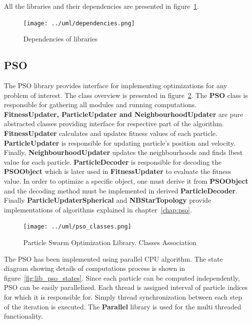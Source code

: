 \documentclass{mini}
\begin{document}
All the libraries and their dependencies are presented in figure~\ref{fig:lib_dependencies}.

\begin{figure}[H]
    \centering
    \texttt{[image: ../uml/dependencies.png]}
    \caption{Dependencies of libraries}
    \label{fig:lib_dependencies}
\end{figure}

\newpage

\subsection{PSO}

The PSO library provides interface for implementing optimizations for any problem of interest. The class overview is presented in figure~\ref{fig:lib_pso_classes}. The {\bf PSO} class is responsible for gathering all modules and running computations. {\bf FitnessUpdater, ParticleUpdater and NeighbourhoodUpdater} are pure abstracted classes providing interface for respective part of the algorithm. {\bf FitnessUpdater} calculates and updates fitness values of each particle. {\bf ParticleUpdater} is responsible for updating particle's position and velocity. Finally, {\bf NeighbourhoodUpdater} updates the neighbourhoods and finds lbest value for each particle. {\bf ParticleDecoder} is responsible for decoding the {\bf PSOObject} which is later used in {\bf FitnessUpdater} to evaluate the fitness value. In order to optimize a specific object, one must derive it from {\bf PSOObject} and the decoding method must be implemented in derived {\bf ParticleDecoder}. Finally {\bf ParticleUpdaterSpherical} and {\bf NBStarTopology} provide implementations of algorithms explained in chapter~\ref{chap:pso}.

\begin{figure}
    \centering
    \texttt{[image: ../uml/pso\_classes.png]}
    \caption{Particle Swarm Optimization Library. Classes Association}
    \label{fig:lib_pso_classes}
\end{figure}

The PSO has been implemented using parallel CPU algorithm. The state diagram showing details of computations process is shown in figure~\ref{fig:lib_pso_states}. Since each particle can be computed independently, PSO can be easily parallelized. Each thread is assigned interval of particle indices for which it is responsible for. Simply thread synchronization between each step of the iteration is executed. The {\bf Parallel } library is used for the multi threaded functionality.
\end{document}
